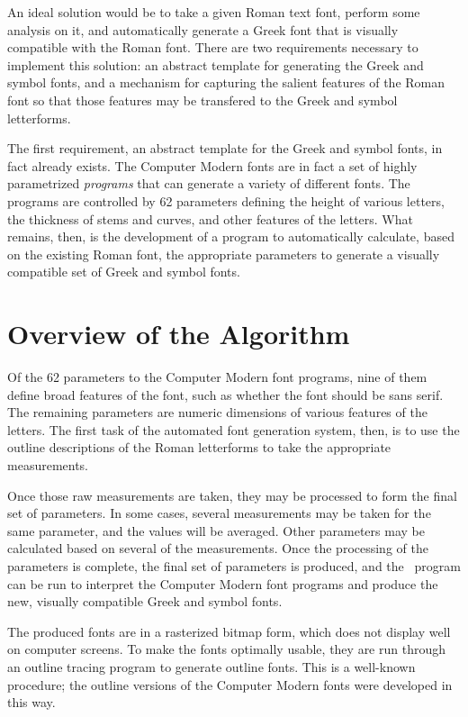 \documentclass[12pt]{article}
\begin{document}
An ideal solution would be to take a given Roman text font, perform some
analysis on it, and automatically generate a Greek font that is visually
compatible with the Roman font. There are two requirements necessary to
implement this solution: an abstract template for generating the Greek and
symbol fonts, and a mechanism for capturing the salient features of the Roman
font so that those features may be transfered to the Greek and symbol
letterforms.

The first requirement, an abstract template for the Greek and symbol fonts, in
fact already exists. The Computer Modern fonts are in fact a set of highly
parametrized \emph{programs} that can generate a variety of different fonts. The
programs are controlled by 62 parameters defining the height of various letters,
the thickness of stems and curves, and other features of the letters. What
remains, then, is the development of a program to automatically calculate, based
on the existing Roman font, the appropriate parameters to generate a visually
compatible set of Greek and symbol fonts.

\section{Overview of the Algorithm}

Of the 62 parameters to the Computer Modern font programs, nine of them define
broad features of the font, such as whether the font should be sans serif. The
remaining parameters are numeric dimensions of various features of the letters.
The first task of the automated font generation system, then, is to use the
outline descriptions of the Roman letterforms to take the appropriate
measurements.

Once those raw measurements are taken, they may be processed to form the final
set of parameters. In some cases, several measurements may be taken for the same
parameter, and the values will be averaged. Other parameters may be calculated
based on several of the measurements. Once the processing of the parameters is
complete, the final set of parameters is produced, and the \MF\ program can be
run to interpret the Computer Modern font programs and produce the new, visually
compatible Greek and symbol fonts.

The produced fonts are in a rasterized bitmap form, which does not display well
on computer screens. To make the fonts optimally usable, they are run through an
outline tracing program to generate outline fonts. This is a well-known
procedure; the outline versions of the Computer Modern fonts were developed in
this way.
\end{document}
